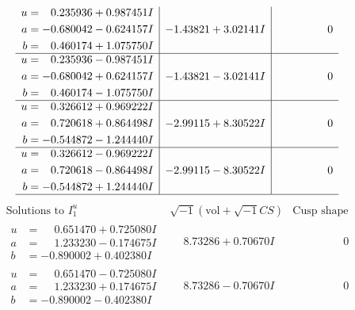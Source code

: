 \documentclass[1p]{elsarticle_modified}
\theoremstyle{definition}
\newcommand{\I}{\sqrt{-1}}
\begin{document}
$$\begin{array}{c|c|c}
\begin{aligned}
u &= \phantom{-}0.235936 + 0.987451 I \\
a &= -0.680042 - 0.624157 I \\
b &= \phantom{-}0.460174 + 1.075750 I\end{aligned}
 & -1.43821 + 3.02141 I & \phantom{-0.000000 } 0 \\ \hline\begin{aligned}
u &= \phantom{-}0.235936 - 0.987451 I \\
a &= -0.680042 + 0.624157 I \\
b &= \phantom{-}0.460174 - 1.075750 I\end{aligned}
 & -1.43821 - 3.02141 I & \phantom{-0.000000 } 0 \\ \hline\begin{aligned}
u &= \phantom{-}0.326612 + 0.969222 I \\
a &= \phantom{-}0.720618 + 0.864498 I \\
b &= -0.544872 - 1.244440 I\end{aligned}
 & -2.99115 + 8.30522 I & \phantom{-0.000000 } 0 \\ \hline\begin{aligned}
u &= \phantom{-}0.326612 - 0.969222 I \\
a &= \phantom{-}0.720618 - 0.864498 I \\
b &= -0.544872 + 1.244440 I\end{aligned}
 & -2.99115 - 8.30522 I & \phantom{-0.000000 } 0\\
 \hline 
 \end{array}$$\newpage$$\begin{array}{c|c|c}  
\text{Solutions to }I^u_{1}& \I (\text{vol} + \sqrt{-1}CS) & \text{Cusp shape}\\
 \hline 
\begin{aligned}
u &= \phantom{-}0.651470 + 0.725080 I \\
a &= \phantom{-}1.233230 - 0.174675 I \\
b &= -0.890002 + 0.402380 I\end{aligned}
 & \phantom{-}8.73286 + 0.70670 I & \phantom{-0.000000 } 0 \\ \hline\begin{aligned}
u &= \phantom{-}0.651470 - 0.725080 I \\
a &= \phantom{-}1.233230 + 0.174675 I \\
b &= -0.890002 - 0.402380 I\end{aligned}
 & \phantom{-}8.73286 - 0.70670 I & \phantom{-0.000000 } 0 \\ \hline\begin{aligned}

\end{aligned}
\end{array}$$
\end{document}
